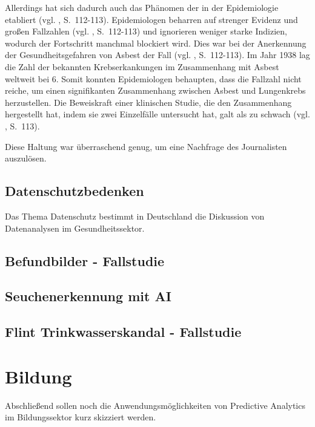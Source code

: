 Allerdings hat sich dadurch auch das Phänomen der \grqq{} in der Epidemiologie etabliert
(vgl. \cite{Proctor}, S.~112-113).
Epidemiologen beharren auf strenger Evidenz und großen Fallzahlen (vgl. \cite{Proctor}, S.~112-113) und ignorieren weniger 
starke Indizien, wodurch der Fortschritt manchmal blockiert wird. Dies war bei der Anerkennung der Gesundheitsgefahren
von Asbest der Fall (vgl. \cite{Proctor}, S.~112-113). Im Jahr 1938 lag die Zahl der bekannten Krebserkankungen im Zusammenhang mit
Asbest weltweit bei 6. Somit konnten Epidemiologen behaupten, dass die Fallzahl nicht reiche, um einen signifikanten Zusammenhang
zwischen Asbest und Lungenkrebs herzustellen. Die Beweiskraft einer klinischen Studie, die den Zusammenhang hergestellt hat, indem sie
zwei Einzelfälle untersucht hat, galt als zu schwach (vgl. \cite{Proctor}, S.~113).



Diese Haltung war überraschend genug, um eine Nachfrage des Journalisten
auszulösen.

\subsection{Datenschutzbedenken}

Das Thema Datenschutz bestimmt in Deutschland die Diskussion von Datenanalysen
im Gesundheitssektor.

\subsection{Befundbilder - Fallstudie}


\subsection{Seuchenerkennung mit AI}


\subsection{Flint Trinkwasserskandal - Fallstudie}

\section{Bildung}
Abschließend sollen noch die Anwendungsmöglichkeiten von Predictive Analytics
im Bildungssektor kurz skizziert werden.

